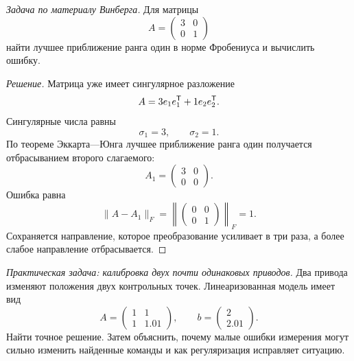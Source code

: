 \begin{problem}
\textit{Задача по материалу Винберга.}
Для матрицы
\[
A=
\begin{pmatrix}
3&0\\
0&1
\end{pmatrix}
\]
найти лучшее приближение ранга один в норме Фробениуса и вычислить ошибку.
\end{problem}

\begin{proof}[Решение]
Матрица уже имеет сингулярное разложение
\[
A
=
3e_1e_1^{\mathsf{T}}
+
1e_2e_2^{\mathsf{T}}.
\]
Сингулярные числа равны
\[
\sigma_1=3,
\qquad
\sigma_2=1.
\]
По теореме Эккарта---Юнга лучшее приближение ранга один получается отбрасыванием второго слагаемого:
\[
A_1
=
\begin{pmatrix}
3&0\\
0&0
\end{pmatrix}.
\]
Ошибка равна
\[
\|A-A_1\|_F
=
\left\|
\begin{pmatrix}
0&0\\
0&1
\end{pmatrix}
\right\|_F
=1.
\]
Сохраняется направление, которое преобразование усиливает в три раза, а более слабое направление отбрасывается.
\end{proof}

\begin{problem}
\textit{Практическая задача: калибровка двух почти одинаковых приводов.}
Два привода изменяют положения двух контрольных точек. Линеаризованная модель имеет вид
\[
A=
\begin{pmatrix}
1&1\\
1&1.01
\end{pmatrix},
\qquad
b=
\begin{pmatrix}
2\\
2.01
\end{pmatrix}.
\]
Найти точное решение. Затем объяснить, почему малые ошибки измерения могут сильно изменить найденные команды и как регуляризация исправляет ситуацию.
\end{problem}

